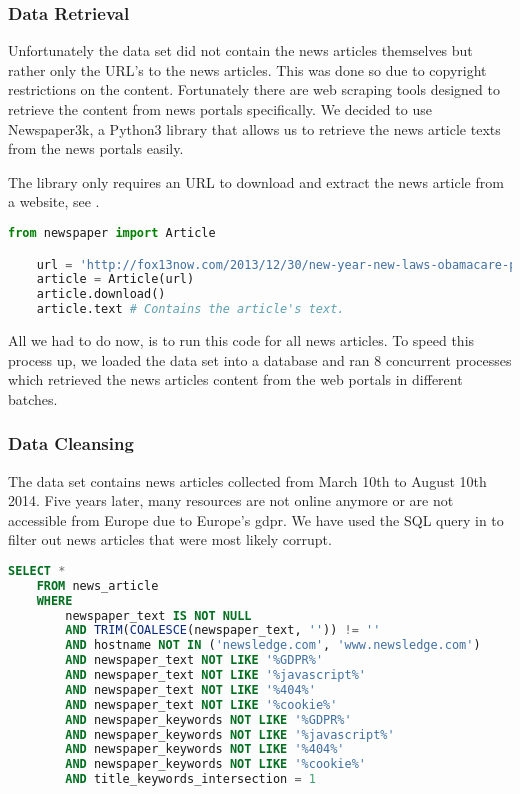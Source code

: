 \subsubsection{Data Retrieval}
\label{subsubsec:4a_data_retrieval}

Unfortunately the data set did not contain the news articles themselves but rather only the URL's to the news articles.
This was done so due to copyright restrictions on the content.
Fortunately there are web scraping tools designed to retrieve the content from news portals specifically.
We decided to use Newspaper3k\cite{newspaper3k},
a Python3 library that allows us to retrieve the news article texts from the news portals easily.

The library only requires an URL to download and extract the news article from a website,
see .

\begin{lstlisting}[language=Python, caption=Retrieve the news article from an URL., label={lst:newspaper3k_code}]
    from newspaper import Article

    url = 'http://fox13now.com/2013/12/30/new-year-new-laws-obamacare-pot-guns-and-drones/'
    article = Article(url)
    article.download()
    article.text # Contains the article's text.
\end{lstlisting}

All we had to do now, is to run this code for all news articles.
To speed this process up, we loaded the data set into a database and ran 8 concurrent processes which
retrieved the news articles content from the web portals in different batches.

\subsubsection{Data Cleansing}
\label{subsubsec:4a_data_cleansing}

The data set contains news articles collected from March 10th to August 10th 2014.
Five years later, many resources are not online anymore or are not accessible from Europe due to Europe's \Gls{gdpr}.
We have used the SQL query in  to filter out news articles that were most likely corrupt.

\begin{lstlisting}[language=SQL, caption=Retrieve valid news articles., label={lst:valid_news_articles_sql}]
    SELECT *
    FROM news_article
    WHERE
        newspaper_text IS NOT NULL
        AND TRIM(COALESCE(newspaper_text, '')) != ''
        AND hostname NOT IN ('newsledge.com', 'www.newsledge.com')
        AND newspaper_text NOT LIKE '%GDPR%'
        AND newspaper_text NOT LIKE '%javascript%'
        AND newspaper_text NOT LIKE '%404%'
        AND newspaper_text NOT LIKE '%cookie%'
        AND newspaper_keywords NOT LIKE '%GDPR%'
        AND newspaper_keywords NOT LIKE '%javascript%'
        AND newspaper_keywords NOT LIKE '%404%'
        AND newspaper_keywords NOT LIKE '%cookie%'
        AND title_keywords_intersection = 1
\end{lstlisting}

